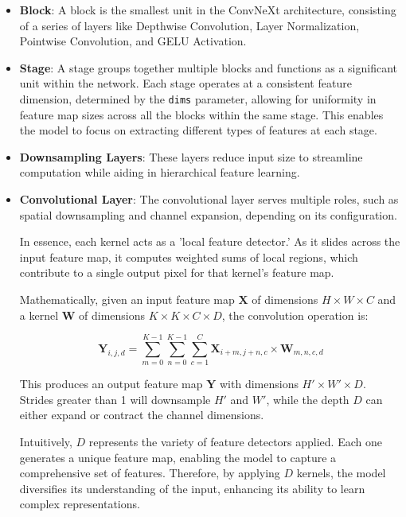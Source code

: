 \documentclass[a4paper,12pt,openright]{book}
\begin{document}
\begin{itemize}
    \item \textbf{Block}: A block is the smallest unit in the ConvNeXt architecture, consisting of a series of layers like Depthwise Convolution, Layer Normalization, Pointwise Convolution, and GELU Activation.
    \item \textbf{Stage}: A stage groups together multiple blocks and functions as a significant unit within the network. Each stage operates at a consistent feature dimension, determined by the \texttt{dims} parameter, allowing for uniformity in feature map sizes across all the blocks within the same stage. This enables the model to focus on extracting different types of features at each stage.
    \item \textbf{Downsampling Layers}: These layers reduce input size to streamline computation while aiding in hierarchical feature learning.
   \item \textbf{Convolutional Layer}:
The convolutional layer serves multiple roles, such as spatial downsampling and channel expansion, depending on its configuration. 

In essence, each kernel acts as a 'local feature detector.' As it slides across the input feature map, it computes weighted sums of local regions, which contribute to a single output pixel for that kernel's feature map.

Mathematically, given an input feature map \( \mathbf{X} \) of dimensions \( H \times W \times C \) and a kernel \( \mathbf{W} \) of dimensions \( K \times K \times C \times D \), the convolution operation is:

\[
\mathbf{Y}_{i,j,d} = \sum_{m=0}^{K-1} \sum_{n=0}^{K-1} \sum_{c=1}^{C} \mathbf{X}_{i+m,j+n,c} \times \mathbf{W}_{m,n,c,d}
\]

This produces an output feature map \( \mathbf{Y} \) with dimensions \( H' \times W' \times D \). Strides greater than 1 will downsample \( H' \) and \( W' \), while the depth \( D \) can either expand or contract the channel dimensions.

Intuitively, \( D \) represents the variety of feature detectors applied. Each one generates a unique feature map, enabling the model to capture a comprehensive set of features. Therefore, by applying \( D \) kernels, the model diversifies its understanding of the input, enhancing its ability to learn complex representations.


\end{itemize}
\end{document}
